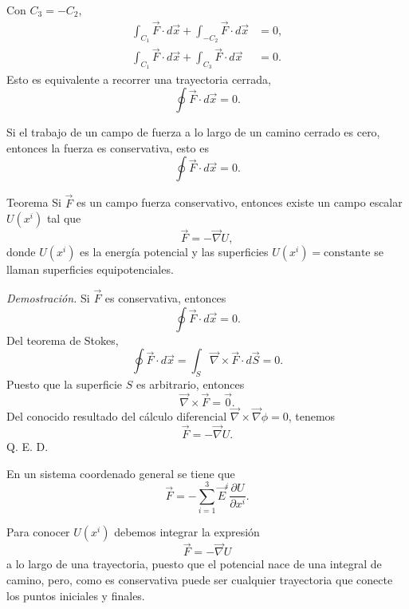 \documentclass[../apunte_mecanica_clasica.tex]{subfiles}%
\begin{document}
Con $C_3=-C_2$,
\begin{align*}
    \int_{C_1}\vec F\cdot d\vec x+
    \int_{-C_2}\vec F\cdot d\vec x&=0,\\
    \int_{C_1}\vec F\cdot d\vec x+
    \int_{C_3}\vec F\cdot d\vec x&=0.
\end{align*}
Esto es equivalente a recorrer una trayectoria cerrada,
\begin{equation*}
    \oint \vec F\cdot d\vec x=0.
\end{equation*}

Si el trabajo de un campo de fuerza a lo largo de un camino cerrado es cero, entonces la fuerza es conservativa, esto es
\begin{equation*}
    \oint \vec F\cdot d\vec x=0.
\end{equation*}

\begin{apuntebloque}{Teorema}
Si $\vec F$ es un campo fuerza conservativo, entonces existe un campo escalar $U(x^i)$ tal que
\begin{equation*}
    \vec F=-\vec\nabla U,
\end{equation*}
donde $U(x^i)$ es la energía potencial y las superficies $U(x^i)=\mathrm{constante}$ se llaman superficies equipotenciales.
\end{apuntebloque}

\emph{Demostración.} Si $\vec F$ es conservativa, entonces
\begin{equation*}
    \oint \vec F\cdot d\vec x=0.
\end{equation*}
Del teorema de Stokes,
\begin{equation*}
    \oint \vec F\cdot d\vec x=\int_S \vec\nabla\times\vec F\cdot d\vec S=0.
\end{equation*}
Puesto que la superficie $S$ es arbitrario, entonces
\begin{equation*}
    \vec\nabla\times\vec F=\vec 0.
\end{equation*}
Del conocido resultado del cálculo diferencial $\vec\nabla\times\vec\nabla\phi=0$, tenemos
\begin{equation*}
    \vec F=-\vec\nabla U.
\end{equation*}
Q. E. D.

En un sistema coordenado general se tiene que
\begin{equation*}
    \vec F=-\sum_{i=1}^{3}\vec E^{i}\frac{\partial U}{\partial x^i}.
\end{equation*}

Para conocer $U(x^i)$ debemos integrar la expresión
\begin{equation*}
    \vec F=-\vec\nabla U
\end{equation*}
a lo largo de una trayectoria, puesto que el potencial nace de una integral de camino, pero, como es conservativa puede ser cualquier trayectoria que conecte los puntos iniciales y finales.
\end{document}
